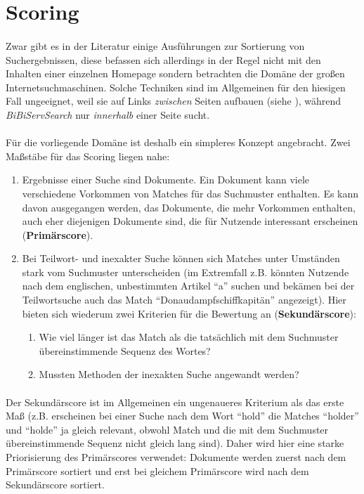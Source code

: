 \section{Scoring}
\label{meth-scoring}

\paragraph{} Zwar gibt es in der Literatur einige Ausführungen zur Sortierung von Suchergebnissen, diese befassen sich allerdings in der Regel nicht mit den Inhalten einer einzelnen Homepage sondern betrachten die Domäne der großen Internetsuchmaschinen. Solche Techniken sind im Allgemeinen für den hiesigen Fall ungeeignet, weil sie auf Links \textit{zwischen} Seiten aufbauen (siehe \cite{google}), während \textit{BiBiServSearch} nur \textit{innerhalb} einer Seite sucht.
\paragraph{} Für die vorliegende Domäne ist deshalb ein simpleres Konzept angebracht. Zwei Maßstäbe für das Scoring liegen nahe:
\begin{enumerate}
 \item Ergebnisse einer Suche sind Dokumente. Ein Dokument kann viele verschiedene Vorkommen von Matches für das Suchmuster enthalten. Es kann davon ausgegangen werden, das Dokumente, die mehr Vorkommen enthalten, auch eher diejenigen Dokumente sind, die für Nutzende interessant erscheinen (\textbf{Primärscore}).
 \item Bei Teilwort- und inexakter Suche können sich Matches unter Umständen stark vom Suchmuster unterscheiden (im Extremfall z.B. könnten Nutzende nach dem englischen, unbestimmten Artikel "`a"' suchen und bekämen bei der Teilwortsuche auch das Match "`Donaudampfschiffkapitän"' angezeigt). Hier bieten sich wiederum zwei Kriterien für die Bewertung an (\textbf{Sekundärscore}):
\begin{enumerate}
 \item Wie viel länger ist das Match als die tatsächlich mit dem Suchmuster übereinstimmende Sequenz des Wortes?
 \item Mussten Methoden der inexakten Suche angewandt werden?
\end{enumerate}
\end{enumerate}

\paragraph{} Der Sekundärscore ist im Allgemeinen ein ungenaueres Kriterium als das erste Maß (z.B. erscheinen bei einer Suche nach dem Wort "`hold"' die Matches "`holder"' und "`holde"' ja gleich relevant, obwohl Match und die mit dem Suchmuster übereinstimmende Sequenz nicht gleich lang sind). Daher wird hier eine starke Priorisierung des Primärscores verwendet: Dokumente werden zuerst nach dem Primärscore sortiert und erst bei gleichem Primärscore wird nach dem Sekundärscore sortiert.

